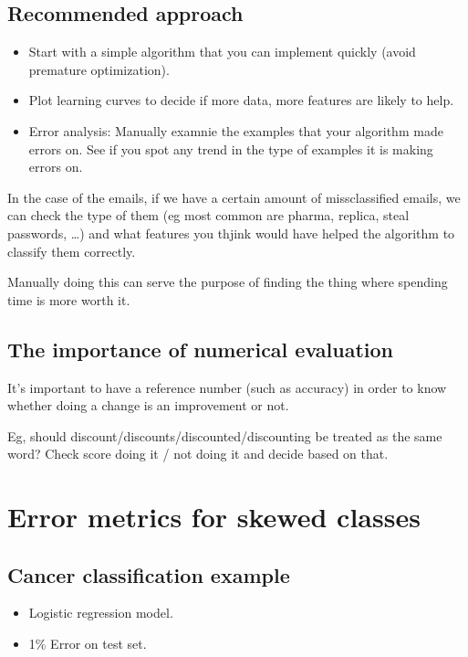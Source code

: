 \documentclass[11pt]{extarticle}
\begin{document}
\subsection{Recommended approach}\label{recommended-approach}

\begin{itemize}
\itemsep1pt\parskip0pt
\item
  Start with a simple algorithm that you can implement quickly (avoid
  premature optimization).
\item
  Plot learning curves to decide if more data, more features are likely
  to help.
\item
  Error analysis: Manually examnie the examples that your algorithm made
  errors on. See if you spot any trend in the type of examples it is
  making errors on.
\end{itemize}

In the case of the emails, if we have a certain amount of missclassified
emails, we can check the type of them (eg most common are pharma,
replica, steal passwords, \ldots{}) and what features you thjink would
have helped the algorithm to classify them correctly.

Manually doing this can serve the purpose of finding the thing where
spending time is more worth it.

\subsection{The importance of numerical
evaluation}\label{the-importance-of-numerical-evaluation}

It's important to have a reference number (such as accuracy) in order to
know whether doing a change is an improvement or not.

Eg, should discount/discounts/discounted/discounting be treated as the
same word? Check score doing it / not doing it and decide based on that.

\section{Error metrics for skewed
classes}\label{error-metrics-for-skewed-classes}

\subsection{Cancer classification
example}\label{cancer-classification-example}

\begin{itemize}
\itemsep1pt\parskip0pt
\item
  Logistic regression model.
\item
  1\% Error on test set.
\end{itemize}
\end{document}
